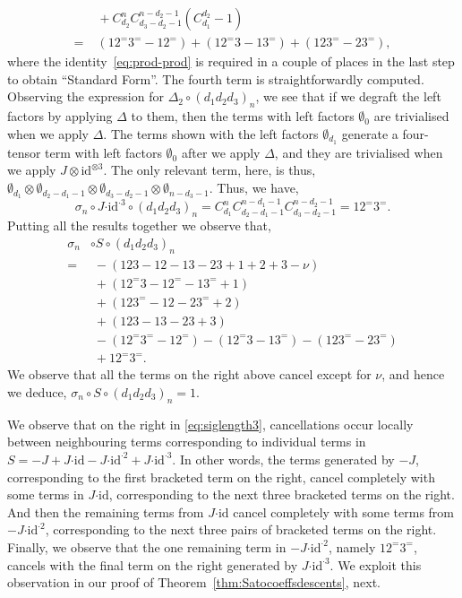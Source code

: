 \documentclass[5p,twocolumn]{elsarticle}
\newcommand*{\id}{{\mathrm{id}}}
\newcommand*{\cendot}{\boldsymbol{\cdot}}
\begin{document}
\begin{example}
\begin{align*}
           &\;+C_{d_2}^{n}C_{d_3-d_2-1}^{n-d_2-1}(C_{d_1}^{d_2}-1)\\
                  =&\;(12^=3^=-12^=)+(12^=3-13^=)+(123^=-23^=),
  \end{align*}
  where the identity~\eqref{eq:prod-prod} is required in a couple of places in the last step to obtain ``Standard Form''.
  The fourth term is straightforwardly computed. Observing the expression for $\Delta_2\circ(d_1d_2d_3)_n$, we see that if we degraft the left factors by applying $\Delta$ to them,
  then the terms with left factors $\emptyset_0$ are trivialised when we apply $\Delta$.
  The terms shown with the left factors $\emptyset_{d_1}$ generate a four-tensor term with left factors $\emptyset_{0}$ after we apply $\Delta$, and they are trivialised when we apply $J\otimes\id^{\otimes 3}$.
  The only relevant term, here, is thus, $\emptyset_{d_1}\otimes\emptyset_{d_2-d_1-1}\otimes\emptyset_{d_3-d_2-1}\otimes\emptyset_{n-d_3-1}$. 
  Thus, we have,
  \begin{equation*}
    \sigma_n\!\circ\! J\!\cendot\!\id^{\cendot3}\!\circ (d_1d_2d_3)_n=C_{d_1}^{n}C_{d_2-d_1-1}^{n-d_1-1}C_{d_3-d_2-1}^{n-d_2-1}=12^=3^=.
  \end{equation*}
  Putting all the results together we observe that,
  \begin{align}
    \sigma_n&\circ S\circ (d_1d_2d_3)_n\nonumber\\
           =&\;-(123-12-13-23+1+2+3-\nu)\nonumber\\
            &\;+(12^=3-12^=-13^=+1)\nonumber\\
            &\;+(123^=-12-23^=+2)\nonumber\\
            &\;+(123-13-23+3)\nonumber\\
            &\;-(12^=3^=-12^=)-(12^=3-13^=)-(123^=-23^=)\nonumber\\
            &\;+12^=3^=.\label{eq:siglength3}
  \end{align}
  We observe that all the terms on the right above cancel except for $\nu$, and hence we deduce, $\sigma_n\circ S\circ (d_1d_2d_3)_n=1$.
\end{example}
%
\begin{remark}\label{rmk:mainthmstrategy}
 We observe that on the right in \eqref{eq:siglength3}, cancellations occur locally between neighbouring terms corresponding to individual terms in $S=-J+J\cendot\id-J\cendot\id^{\cendot2}+J\cendot\id^{\cendot3}$.
 In other words, the terms generated by $-J$, corresponding to the first bracketed term on the right, cancel completely with some terms in $J\cendot\id$, corresponding to the next three bracketed terms on the right.
 And then the remaining terms from $J\cendot\id$ cancel completely with some terms from $-J\cendot\id^{\cendot2}$, corresponding to the next three pairs of bracketed terms on the right.
 Finally, we observe that the  one remaining term in $-J\cendot\id^{\cendot2}$, namely $12^=3^=$, cancels with the final term on the right generated by $J\cendot\id^{\cendot3}$. 
 We exploit this observation in our proof of Theorem~\ref{thm:Satocoeffsdescents}, next.  
\end{remark}
\end{document}

